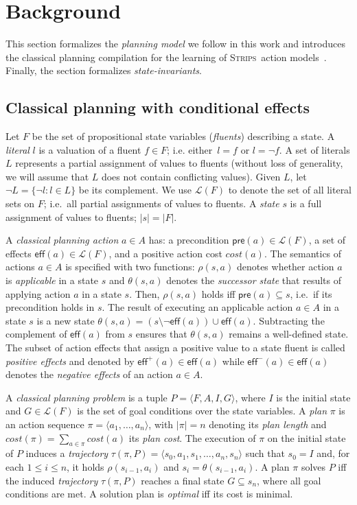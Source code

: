 \documentclass{article}
\newcommand{\tup}[1]{{\langle #1 \rangle}}
\newcommand{\pre}{\mathsf{pre}}     %
\newcommand{\eff}{\mathsf{eff}}     %
\newcommand{\strips}{\textsc{Strips}}
\begin{document}
\section{Background}
\label{sec:background}
This section formalizes the {\em planning model} we follow in this work and introduces the classical planning compilation for the learning of \strips\ action models~\cite{aineto2018learning}. Finally, the section formalizes {\em state-invariants}.

\subsection{Classical planning with conditional effects}
Let $F$ be the set of  propositional state variables ({\em fluents}) describing a state. A {\em literal} $l$ is a valuation of a fluent $f\in F$; i.e. either~$l=f$ or $l=\neg f$. A set of literals $L$ represents a partial assignment of values to fluents (without loss of generality, we will assume that $L$ does not contain conflicting values). Given $L$, let $\neg L=\{\neg l:l\in L\}$ be its complement. We use $\mathcal{L}(F)$ to denote the set of all literal sets on $F$; i.e.~all partial assignments of values to fluents. A {\em state} $s$ is a full assignment of values to fluents; $|s|=|F|$.

A {\em classical planning action} $a\in A$ has: a precondition $\pre(a)\in\mathcal{L}(F)$, a set of effects $\eff(a)\in\mathcal{L}(F)$, and a positive action cost $cost(a)$. The semantics of actions $a\in A$ is specified with two functions: $\rho(s,a)$ denotes whether action $a$ is {\em applicable} in a state $s$ and $\theta(s,a)$ denotes the {\em successor state} that results of applying action $a$ in a state $s$. Then, $\rho(s,a)$ holds iff $\pre(a)\subseteq s$, i.e.~if its precondition holds in $s$. The result of executing an applicable action $a\in A$ in a state $s$ is a new state $\theta(s,a)=(s\setminus \neg\eff(a))\cup\eff(a)$. Subtracting the complement of $\eff(a)$ from $s$ ensures that $\theta(s,a)$ remains a well-defined state. The subset of action effects that assign a positive value to a state fluent is called {\em positive effects} and denoted by $\eff^+(a)\in \eff(a)$ while $\eff^-(a)\in \eff(a)$ denotes the {\em negative effects} of an action $a\in A$.

A {\em classical planning problem} is a tuple $P=\tup{F,A,I,G}$, where $I$ is the initial state and $G\in\mathcal{L}(F)$ is the set of goal conditions over the state variables. A {\em plan} $\pi$ is an action sequence $\pi=\tup{a_1, \ldots, a_n}$, with $|\pi|=n$ denoting its {\em plan length} and $cost(\pi)=\sum_{a\in\pi} cost(a)$ its {\em plan cost}. The execution of $\pi$ on the initial state of $P$ induces a {\em trajectory} $\tau(\pi,P)=\tup{s_0, a_1, s_1, \ldots, a_n, s_n}$ such that $s_0=I$ and, for each {\small $1\leq i\leq n$}, it holds $\rho(s_{i-1},a_i)$ and $s_i=\theta(s_{i-1},a_i)$. A plan $\pi$ solves $P$ iff the induced {\em trajectory} $\tau(\pi,P)$ reaches a final state $G \subseteq s_n$, where all goal conditions are met. A solution plan is {\em optimal} iff its cost is minimal.
\end{document}
